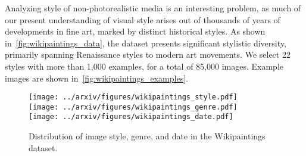 Analyzing style of non-photorealistic media is an interesting problem, as much of our present understanding of visual style arises out of thousands of years of developments in fine art, marked by distinct historical styles.
As shown in~\autoref{fig:wikipaintings_data}, the dataset presents significant stylistic diversity, primarily spanning Renaissance styles to modern art movements.
We select 22 styles with more than 1,000 examples, for a total of 85,000 images.
Example images are shown in~\autoref{fig:wikipaintings_examples}.

\begin{figure}[th]
\centering
\texttt{[image: ../arxiv/figures/wikipaintings\_style.pdf]}\\
\texttt{[image: ../arxiv/figures/wikipaintings\_genre.pdf]}\\
\texttt{[image: ../arxiv/figures/wikipaintings\_date.pdf]}
\caption{Distribution of image style, genre, and date in the Wikipaintings dataset.}
\label{fig:wikipaintings_data}
\end{figure}
